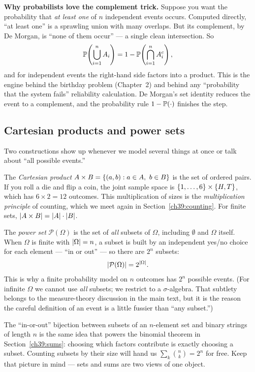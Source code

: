 \begin{happeningbox}
\textbf{Why probabilists love the complement trick.} Suppose you want the
probability that \emph{at least one} of $n$ independent events occurs. Computed
directly, ``at least one'' is a sprawling union with many overlaps. But its
complement, by De Morgan, is ``none of them occur'' --- a single clean
intersection. So
\[
  \P\!\left(\bigcup_{i=1}^n A_i\right) = 1 - \P\!\left(\bigcap_{i=1}^n
  A_i^c\right),
\]
and for independent events the right-hand side factors into a product. This is
the engine behind the birthday problem (Chapter~2) and behind any
``probability that the system fails'' reliability calculation. De Morgan's set
identity reduces the event to a complement, and the probability rule $1-\P(\cdot)$ finishes the step.
\end{happeningbox}

\subsection{Cartesian products and power sets}

Two constructions show up whenever we model several things at once or talk
about ``all possible events.''

The \emph{Cartesian product} $A \times B = \set{(a,b) : a \in A,\ b \in B}$ is
the set of ordered pairs. If you roll a die and flip a coin, the joint sample
space is $\set{1,\dots,6} \times \set{H,T}$, which has $6 \times 2 = 12$
outcomes. This multiplication of sizes is the
\emph{multiplication principle} of counting, which we meet again in
Section~\ref{ch39:counting}. For finite sets, $\abs{A \times B} = \abs{A}\cdot
\abs{B}$.

The \emph{power set} $\mathcal{P}(\Omega)$ is the set of \emph{all} subsets of
$\Omega$, including $\emptyset$ and $\Omega$ itself. When $\Omega$ is finite
with $\abs{\Omega} = n$, a subset is built by an independent yes/no choice for
each element --- ``in or out'' --- so there are $2^n$ subsets:
\[
  \abs{\mathcal{P}(\Omega)} = 2^{\abs{\Omega}}.
\]
This is why a finite probability model on $n$ outcomes has $2^n$ possible
events. (For infinite $\Omega$ we cannot use \emph{all} subsets; we restrict
to a $\sigma$-algebra. That subtlety belongs to the measure-theory discussion
in the main text, but it is the reason the careful definition of an event is a
little fussier than ``any subset.'')

\begin{connectionbox}
The ``in-or-out'' bijection between subsets of an $n$-element set and binary
strings of length $n$ is the same idea that powers the binomial theorem in
Section~\ref{ch39:sums}: choosing which factors contribute is exactly choosing
a subset. Counting subsets by their size will hand us $\sum_k \binom{n}{k} =
2^n$ for free. Keep that picture in mind --- sets and sums are two views of
one object.
\end{connectionbox}

